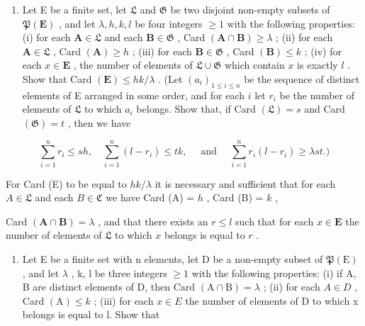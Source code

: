 \begin{enumerate}
\def\labelenumi{\arabic{enumi}.}
\setcounter{enumi}{14}
\tightlist
\item
  Let E be a finite set, let \(\mathfrak{L}\) and \(\mathfrak{G}\) be two disjoint non-empty subsets of \(\mathfrak{P}(\mathbf{E})\) , and let \(\lambda, h, k, l\) be four integers \(\geqslant 1\) with the following properties: (i) for each \(\mathbf{A} \in \mathfrak{L}\) and each \(\mathbf{B} \in \mathfrak{G}\) , Card \((\mathbf{A} \cap \mathbf{B}) \geqslant \lambda\) ; (ii) for each \(\mathbf{A} \in \mathfrak{L}\) , Card \((\mathbf{A}) \geqslant h\) ; (iii) for each \(\mathbf{B} \in \mathfrak{G}\) , Card \((\mathbf{B}) \leqslant k\) ; (iv) for each \(x \in \mathbf{E}\) , the number of elements of \(\mathfrak{L} \cup \mathfrak{G}\) which contain \(x\) is exactly \(l\) . Show that Card \((\mathbf{E}) \leqslant hk / \lambda\) . (Let \((a_i)_{1 \leqslant i \leqslant n}\) be the sequence of distinct elements of E arranged in some order, and for each \(i\) let \(r_i\) be the number of elements of \(\mathfrak{L}\) to which \(a_i\) belongs. Show that, if Card \((\mathfrak{L}) = s\) and Card \((\mathfrak{G}) = t\) , then we have
\end{enumerate}

\[
\sum_ {i = 1} ^ {n} r _ {i} \leqslant s h, \quad \sum_ {i = 1} ^ {n} (l - r _ {i}) \leqslant t k, \quad \text { and } \quad \sum_ {i = 1} ^ {n} r _ {i} (l - r _ {i}) \geqslant \lambda s t.)
\]

For Card (E) to be equal to \(hk / \lambda\) it is necessary and sufficient that for each \(A \in \mathfrak{L}\) and each \(B \in \mathfrak{C}\) we have Card (A) = \(h\) , Card (B) = \(k\) ,

Card \((\mathbf{A} \cap \mathbf{B}) = \lambda\) , and that there exists an \(r \leqslant l\) such that for each \(x \in \mathbf{E}\) the number of elements of \(\mathfrak{L}\) to which \(x\) belongs is equal to \(r\) .

\begin{enumerate}
\def\labelenumi{\arabic{enumi}.}
\setcounter{enumi}{15}
\tightlist
\item
  Let E be a finite set with n elements, let D be a non-empty subset of \(\mathfrak{P}(\mathrm{E})\) , and let \(\lambda\) , k, l be three integers \(\geqslant 1\) with the following properties: (i) if A, B are distinct elements of D, then Card \((\mathrm{A} \cap \mathrm{B}) = \lambda\) ; (ii) for each \(A \in D\) , Card \((\mathrm{A}) \leqslant k\) ; (iii) for each \(x \in E\) the number of elements of D to which x belongs is equal to l. Show that
\end{enumerate}


